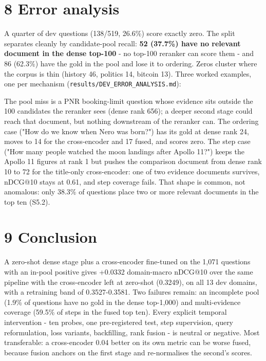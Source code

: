 \documentclass[11pt]{article}
\begin{document}
\section*{8 Error analysis}
A quarter of dev questions (138/519, 26.6\%) score exactly zero. The split separates cleanly by candidate-pool recall: \textbf{52 (37.7\%) have no relevant document in the dense top-100} - no top-100 reranker can score them - and 86 (62.3\%) have the gold in the pool and lose it to ordering. Zeros cluster where the corpus is thin (history 46, politics 14, bitcoin 13). Three worked examples, one per mechanism (\texttt{results/DEV\_ERROR\_ANALYSIS.md}):

\begin{table}[t]
\centering
\footnotesize
{}%
\end{table}

The pool miss is a PNR booking-limit question whose evidence sits outside the 100 candidates the reranker sees (dense rank 656); a deeper second stage could reach that document, but nothing downstream of the reranker can. The ordering case ("How do we know when Nero was born?") has its gold at dense rank 24, moves to 14 for the cross-encoder and 17 fused, and scores zero. The step case ("How many people watched the moon landings after Apollo 11?") keeps the Apollo 11 figures at rank 1 but pushes the comparison document from dense rank 10 to 72 for the title-only cross-encoder: one of two evidence documents survives, nDCG@10 stays at 0.61, and step coverage fails. That shape is common, not anomalous: only 38.3\% of questions place two or more relevant documents in the top ten (S5.2).

\section*{9 Conclusion}
A zero-shot dense stage plus a cross-encoder fine-tuned on the 1,071 questions with an in-pool positive gives +0.0332 domain-macro nDCG@10 over the same pipeline with the cross-encoder left at zero-shot (0.3249), on all 13 dev domains, with a retraining band of 0.3527-0.3581. Two failures remain: an incomplete pool (1.9\% of questions have no gold in the dense top-1,000) and multi-evidence coverage (59.5\% of steps in the fused top ten). Every explicit temporal intervention - ten probes, one pre-registered test, step supervision, query reformulation, loss variants, backfilling, rank fusion - is neutral or negative. Most transferable: a cross-encoder 0.04 better on its own metric can be worse fused, because fusion anchors on the first stage and re-normalises the second’s scores.
\end{document}
